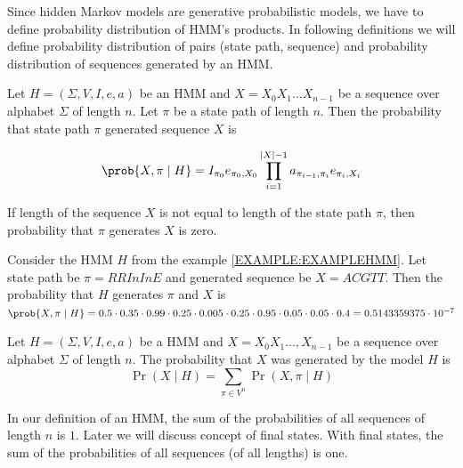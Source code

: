 
Since hidden Markov models are generative probabilistic models, we have to
define probability distribution of HMM's products. In following definitions we
will define probability distribution of pairs (state path, sequence) and
probability distribution of sequences generated by an HMM.

\begin{definition}
Let $H=(\Sigma,V,I,e,a)$ be an HMM and $X=X_0X_1\dots X_{n-1}$ be a sequence over
alphabet $\Sigma$ of length $n$. Let $\pi$ be a state path of length $n$. Then the
probability that state path $\pi$ generated sequence $X$ is 

\[\prob{X,\pi\mid H}=
I_{\pi_0}e_{\pi_0,X_0}\prod_{i=1}^{|X|-1}a_{\pi_{i-1},\pi_i}e_{\pi_i,X_i}\]

If length of the sequence $X$ is not equal to length of the state path $\pi$,
then
probability that $\pi$ generates $X$ is zero.
\end{definition}



\begin{example}
Consider the HMM $H$ from the example \ref{EXAMPLE:EXAMPLEHMM}. Let state path be $\pi=RRInInE$ and
generated sequence be $X=ACGTT$. Then the probability that $H$ generates $\pi$
and $X$ is 
$\prob{ X,\pi\mid H } = 0.5 \cdot 0.35 \cdot 0.99 \cdot 0.25 \cdot 0.005 \cdot 0.25 \cdot 0.95 \cdot 0.05 \cdot 0.05 \cdot 0.4 =
0.5143359375  \cdot  10^{-7}$
\end{example}

\begin{definition}
Let $H=(\Sigma,V,I,e,a)$ be a HMM and $X=X_0X_1\dots,X_{n-1}$ be a sequence over
alphabet $\Sigma$ of length $n$. The probability that $X$ was generated by the
model $H$ is 
\[\Pr\left(X\mid H\right)=\sum_{\pi\in V^n}\Pr\left(X,\pi\mid H\right)\]
\end{definition}



\begin{note}
In our  definition of an HMM, the sum of the probabilities of all sequences of
length $n$ is $1$. Later we will discuss concept of final states. With final
states, the sum of the probabilities of all sequences (of all lengths) is one.

\end{note}

